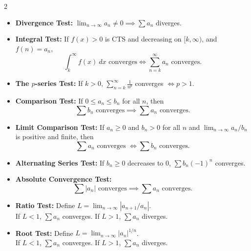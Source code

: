 \documentclass{article}
\newenvironment{bx}[1][]{
\begin{tcolorbox}[colback=white!97!black, title=#1, arc=0in, halign=flush left, left=1mm, right=1mm,]
}{
\end{tcolorbox}
}
\begin{document}
\begin{multicols}{2}
\begin{bx}[Power Series]
\end{bx}

\columnbreak



\begin{bx}[Test for Convergence and Divergence]

\begin{itemize}[leftmargin=1em]

\item \textbf{Divergence Test:} ${\displaystyle \lim_{n\to\infty}a_n\neq 0 }\implies \sum a_n $ diverges.\\

\item \textbf{Integral Test:}
If $f(x) > 0$ is CTS and decreasing on $[k,\infty)$, and $f(n)=a_n$,
$$\int_k^\infty f(x)\ dx\text{ converges} \iff \sum_{n=k}^\infty a_n\text{ converges}.$$

\item \textbf{The $p$-series Test:}
 If $k>0$, $\displaystyle\sum_{n=k}^\infty\frac{1}{n^p}$ converges $\iff p>1$.


\item \textbf{Comparison Test:}
 If $0\leq a_n\leq b_n$ for all $n$, then
 $$\sum b_n\text{ converges}\implies \sum a_n\text{ converges}.$$


\item \textbf{Limit Comparison Test:}
If $a_n\geq 0$ and $b_n > 0$ for all $n$ and $\displaystyle\lim_{n\to\infty}{a_n}/{b_n}$ is positive and finite, then $$\sum a_n\text{ converges }\iff \sum b_n\text{ converges}.$$


\item \textbf{Alternating Series Test:}
If $b_{n} \geq 0$ decreases to 0, $\sum b_{n}(-1)^{n}$ converges.


\item \textbf{Absolute Convergence Test:}
$$\sum |a_n| \text{ converges}\implies \sum a_n\text{ converges}.$$

\item \textbf{Ratio Test:} Define $\displaystyle L= \lim _{n \to \infty} \left|{a_{n+1}}/{a_{n}}\right|$.\\ If $L<1$, $\sum a_{n}$ converges. If $L>1$,  $\sum a_{n}$ diverges.


\item \textbf{Root Test:}
Define $L={\displaystyle\lim _{n \to \infty}}\left|a_{n}\right|^{{1}/{n}}$.\\ If $L<1$, $\sum a_{n}$ converges. If $L>1$,  $\sum a_{n}$ diverges.


\end{itemize}
\end{bx}
\end{multicols}
\end{document}
